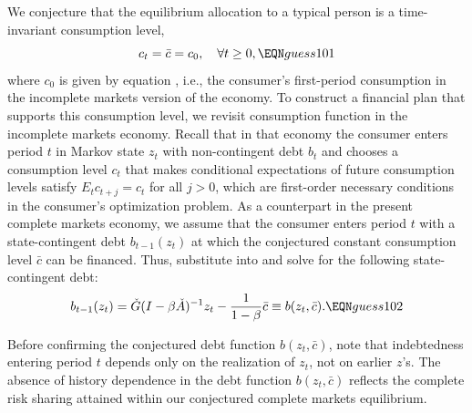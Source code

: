 We conjecture that the equilibrium allocation to a typical person  is a time-invariant consumption level, 
$$ c_t = \bar c  = c_0 , \quad \forall t \geq 0, \EQN guess101 $$
where  $c_0$ is given by equation , i.e.,
the consumer's first-period consumption in the 
incomplete markets version of the economy.
To construct a financial plan that supports this
 consumption level, we revisit consumption
function  in the 
incomplete markets economy. Recall that in that economy  
the consumer enters period $t$ in Markov state $z_t$
with non-contingent debt $b_t$ and chooses a 
consumption level $c_t$ that makes conditional 
expectations of  future consumption levels  satisfy 
$E_t c_{t+j} = c_t$ for all $j>0$, which are 
first-order necessary conditions in the consumer's
optimization problem. As a counterpart 
in the present complete markets 
economy,  we assume  that the consumer enters period $t$
with a state-contingent debt $b_{t-1}(z_t)$ at which the  conjectured constant 
consumption level $\bar c$ can be financed. Thus, 
substitute  into 
 and
solve for the following state-contingent debt:
$$ b_{t-1}(z_{t}) =  \check G(I-\beta \check A)^{-1} z_{t} 
- {\frac{1}{1-\beta}} \bar c \equiv b(z_{t}, \bar c) . 
                                           \EQN guess102 $$
                                           
Before confirming the conjectured debt function $b(z_{t}, \bar c)$, 
note  that indebtedness  entering
period $t$ depends %
only on 
the realization of $z_{t}$, not on earlier $z$'s.
The absence of history dependence in the debt function $b(z_{t}, \bar c)$
reflects the   complete risk sharing attained within 
our conjectured complete markets equilibrium.


